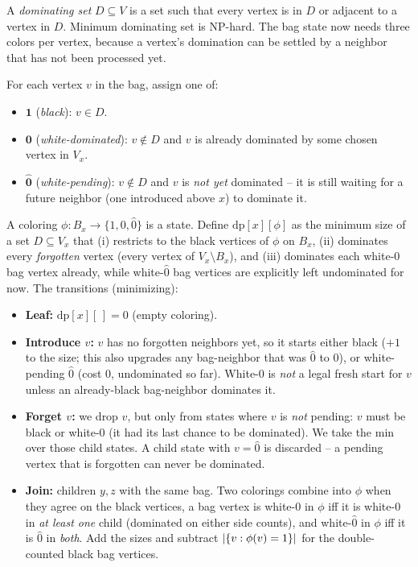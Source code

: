 A \emph{dominating set} $D\subseteq V$ is a set such that every vertex is in $D$
or adjacent to a vertex in $D$. Minimum dominating set is NP-hard. The bag state
now needs three colors per vertex, because a vertex's domination can be settled by
a neighbor that has not been processed yet.

For each vertex $v$ in the bag, assign one of:
\begin{itemize}
  \item \textcolor{sourceblue}{$\mathbf{1}$} (\emph{black}): $v\in D$.
  \item \textcolor{targetgreen}{$\mathbf{0}$} (\emph{white-dominated}): $v\notin
        D$ and $v$ is already dominated by some chosen vertex in $V_x$.
  \item \textcolor{quotientorange}{$\hat{\mathbf{0}}$} (\emph{white-pending}):
        $v\notin D$ and $v$ is \emph{not yet} dominated -- it is still waiting for
        a future neighbor (one introduced above $x$) to dominate it.
\end{itemize}
A coloring $\phi:B_x\to\{1,0,\hat 0\}$ is a state. Define $\mathrm{dp}[x][\phi]$ as
the minimum size of a set $D\subseteq V_x$ that (i) restricts to the black
vertices of $\phi$ on $B_x$, (ii) dominates every \emph{forgotten} vertex (every
vertex of $V_x\setminus B_x$), and (iii) dominates each white-$0$ bag vertex
already, while white-$\hat 0$ bag vertices are explicitly left undominated for
now. The transitions (minimizing):

\begin{itemize}
  \item \textbf{Leaf:} $\mathrm{dp}[x][\,]=0$ (empty coloring).
  \item \textbf{Introduce $v$:} $v$ has no forgotten neighbors yet, so it starts
        either black ($+1$ to the size; this also upgrades any bag-neighbor that
        was $\hat 0$ to $0$), or white-pending $\hat 0$ (cost $0$, undominated so
        far). White-$0$ is \emph{not} a legal fresh start for $v$ unless an
        already-black bag-neighbor dominates it.
  \item \textbf{Forget $v$:} we drop $v$, but only from states where $v$ is
        \emph{not} pending: $v$ must be black or white-$0$ (it had its last chance
        to be dominated). We take the min over those child states. A child state
        with $v=\hat 0$ is discarded -- a pending vertex that is forgotten can
        never be dominated.
  \item \textbf{Join:} children $y,z$ with the same bag. Two colorings combine
        into $\phi$ when they agree on the black vertices, a bag vertex is
        white-$0$ in $\phi$ iff it is white-$0$ in \emph{at least one} child
        (dominated on either side counts), and white-$\hat0$ in $\phi$ iff it is
        $\hat0$ in \emph{both}. Add the sizes and subtract $\lvert\{v:\phi(v)=1\}\rvert$
        for the double-counted black bag vertices.
\end{itemize}

